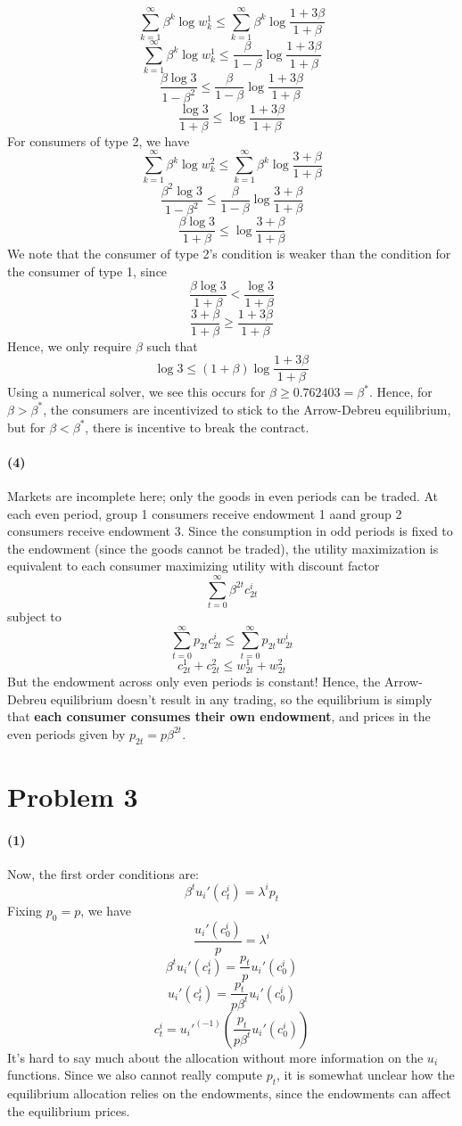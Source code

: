 \documentclass[10pt,letter]{article}
\newcommand{\problem}[1]{\section*{Problem #1}}
\newcommand{\problempart}[1]{\paragraph{#1}}
\begin{document}
\[ \sum_{k=1}^\infty \beta^k \log w^1_k \le \sum_{k=1}^\infty \beta^k \log \frac{1+3\beta}{1+\beta} \]
\[ \sum_{k=1}^\infty \beta^k \log w^1_k \le \frac{\beta}{1-\beta}\log \frac{1+3\beta}{1+\beta} \]
\[ \frac{\beta \log 3}{1-\beta^2} \le \frac{\beta}{1-\beta}\log \frac{1+3\beta}{1+\beta} \]
\[ \frac{\log 3}{1+\beta} \le \log \frac{1+3\beta}{1+\beta} \]
For consumers of type 2, we have
\[ \sum_{k=1}^\infty \beta^k \log w^2_k \le \sum_{k=1}^\infty \beta^k \log \frac{3+\beta}{1+\beta} \]
\[ \frac{\beta^2 \log 3}{1-\beta^2} \le \frac{\beta}{1-\beta}\log \frac{3+\beta}{1+\beta} \]
\[ \frac{\beta \log 3}{1+\beta} \le \log \frac{3+\beta}{1+\beta} \]
We note that the consumer of type 2's condition is weaker than the condition for the consumer of type 1, since
\[ \frac{\beta \log 3}{1+\beta} < \frac{\log 3}{1+\beta} \]
\[ \frac{3+\beta}{1+\beta} \ge \frac{1+3\beta}{1+\beta} \]
Hence, we only require $\beta$ such that
\[ \log 3 \le (1+\beta) \log \frac{1+3\beta}{1+\beta} \]
Using a numerical solver, we see this occurs for $\beta \ge 0.762403 = \beta^* $. Hence, for $\beta > \beta^*$, the consumers are incentivized to stick to the Arrow-Debreu equilibrium, but for $\beta < \beta^*$, there is incentive to break the contract.
\problempart{(4)}
Markets are incomplete here; only the goods in even periods can be traded. At each even period, group 1 consumers receive endowment 1 aand group 2 consumers receive endowment 3. Since the consumption in odd periods is fixed to the endowment (since the goods cannot be traded), the utility maximization is equivalent to each consumer maximizing utility with discount factor
\[ \sum_{t=0}^\infty \beta^{2t} c^i_{2t} \]
subject to
\[ \sum_{t=0}^\infty p_{2t} c^i_{2t} \le \sum_{t=0}^\infty p_{2t} w^i_{2t}\]
\[ c^1_{2t} + c^2_{2t} \le w^1_{2t} + w^2_{2t} \]
But the endowment across only even periods is constant! Hence, the Arrow-Debreu equilibrium doesn't result in any trading, so the equilibrium is simply that \textbf{each consumer consumes their own endowment}, and prices in the even periods given by $p_{2t} = p\beta^{2t}$.
\problem{3}
\problempart{(1)}
Now, the first order conditions are:
\[ \beta^t u_i'(c^i_t) = \lambda^i p_t \]
Fixing $p_0 = p$, we have
\[  \frac{u_i'(c^i_0)}{p} = \lambda^i \]
\[ \beta^t u_i'(c^i_t) = \frac{p_t}{p} u_i'(c^i_0) \]
\[ u_i'(c^i_t) = \frac{p_t}{p\beta^t } u_i'(c^i_0) \]
\[ c^i_t = u_i'^{(-1)} \left( \frac{p_t}{p\beta^t } u_i'(c^i_0) \right) \]
It's hard to say much about the allocation without more information on the $u_i$ functions. Since we also cannot really compute $p_t$, it is somewhat unclear how the equilibrium allocation relies on the endowments, since the endowments can affect the equilibrium prices.
\end{document}
